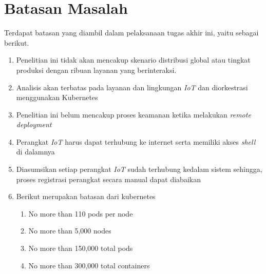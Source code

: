 \section{Batasan Masalah}
\label{sec:batasan-masalah}

Terdapat batasan yang diambil dalam pelaksanaan tugas akhir ini, yaitu sebagai berikut.

\begin{enumerate}
  \item Penelitian ini tidak akan mencakup skenario distribusi global atau tingkat produksi dengan ribuan layanan yang berinteraksi.
  \item Analisis akan terbatas pada layanan dan lingkungan \textit{IoT} dan diorkestrasi menggunakan Kubernetes
  \item Penelitian ini belum mencakup proses keamanan ketika melakukan \textit{remote deployment}
  \item Perangkat \textit{IoT} harus dapat terhubung ke internet serta memiliki akses \textit{shell} di dalamnya
  \item Diasumsikan setiap perangkat \textit{IoT} sudah terhubung kedalam sistem sehingga, proses registrasi perangkat secara manual dapat diabaikan
  \item Berikut merupakan batasan dari kubernetes
        \begin{enumerate}
          \item No more than 110 pods per node
          \item No more than 5,000 nodes
          \item No more than 150,000 total pods
          \item No more than 300,000 total containers
        \end{enumerate}
\end{enumerate}

